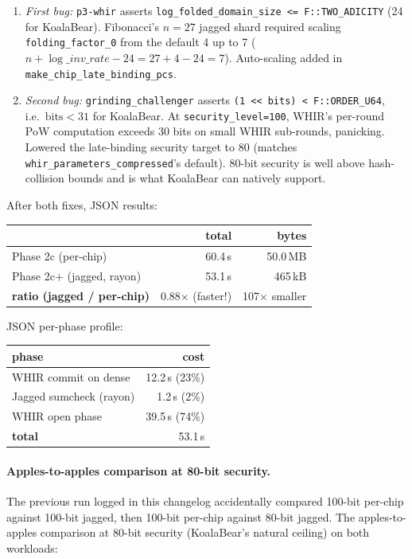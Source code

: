 \begin{enumerate}
  \item \textit{First bug:} \texttt{p3-whir} asserts
        \texttt{log\_folded\_domain\_size <= F::TWO\_ADICITY} (24 for
        KoalaBear).  Fibonacci's $n=27$ jagged shard required scaling
        \texttt{folding\_factor\_0} from the default 4 up to 7
        ($n + \log\_inv\_rate - 24 = 27+4-24 = 7$).  Auto-scaling
        added in \texttt{make\_chip\_late\_binding\_pcs}.
  \item \textit{Second bug:} \texttt{grinding\_challenger} asserts
        \texttt{(1 << bits) < F::ORDER\_U64}, i.e.~$\text{bits} < 31$
        for KoalaBear.  At \texttt{security\_level=100}, WHIR's
        per-round PoW computation exceeds 30 bits on small WHIR
        sub-rounds, panicking.  Lowered the late-binding security
        target to 80 (matches \texttt{whir\_parameters\_compressed}'s
        default).  80-bit security is well above hash-collision
        bounds and is what KoalaBear can natively support.
\end{enumerate}

After both fixes, JSON results:

\begin{tabular}{lrr}
\toprule
                                & \textbf{total} & \textbf{bytes} \\
\midrule
Phase 2c (per-chip)             & 60.4\,s        & 50.0\,MB \\
Phase 2c+ (jagged, rayon)       & 53.1\,s        & 465\,kB \\
\midrule
\textbf{ratio (jagged / per-chip)} & 0.88$\times$ (faster!) & 107$\times$ smaller \\
\bottomrule
\end{tabular}

JSON per-phase profile:
\begin{tabular}{lr}
\toprule
\textbf{phase}            & \textbf{cost} \\
\midrule
WHIR commit on dense      & 12.2\,s  (23\%) \\
Jagged sumcheck (rayon)   & 1.2\,s   (2\%) \\
WHIR open phase           & 39.5\,s  (74\%) \\
\midrule
\textbf{total}            & 53.1\,s \\
\bottomrule
\end{tabular}

\paragraph{Apples-to-apples comparison at 80-bit security.}
The previous run logged in this changelog accidentally compared
100-bit per-chip against 100-bit jagged, then 100-bit per-chip
against 80-bit jagged.  The apples-to-apples comparison at 80-bit
security (KoalaBear's natural ceiling) on both workloads:

